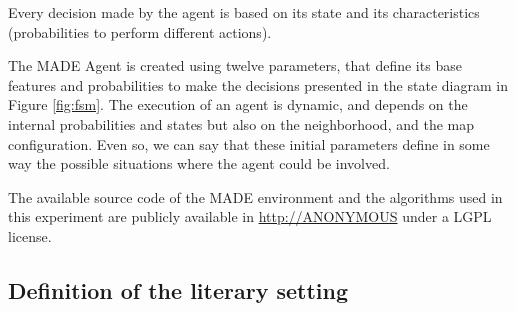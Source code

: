 \documentclass{sig-alternate}
\begin{document}
Every
decision made by the agent is based on its state and its
characteristics (probabilities to perform different actions). %







The MADE Agent is created using twelve parameters, that define its
base features and probabilities to make the decisions presented in the
state diagram in Figure \ref{fig:fsm}. The execution of an
agent is dynamic, and depends on the internal probabilities and states
but also on the neighborhood, and the map configuration. Even so, we
can say that these initial parameters define in some way the possible
situations where the agent could be involved.



The available source code of the MADE environment and the algorithms used in this experiment are publicly available in \url{http://ANONYMOUS} under a LGPL license.

\subsection{Definition of the literary setting}
\end{document}
